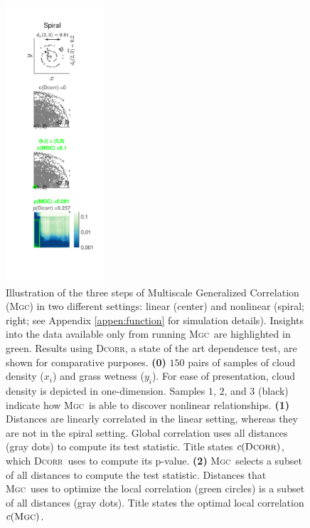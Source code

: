 \documentclass[11pt]{article}
\providecommand{\sct}[1]{{\normalfont\textsc{#1}}}
\newcommand{\GG}{c}
\newcommand{\Mgc}{\sct{Mgc}}
\newcommand{\Dcorr}{\sct{Dcorr}}
\begin{document}
\begin{figure}
\includegraphics[width=0.32\textwidth,height=0.75\textheight,trim={1.95cm 1.88cm 0.73cm 1.57cm},clip]{Figures/Fig8.pdf}
\caption{Illustration of the three steps of Multiscale Generalized Correlation (\Mgc) in two different settings: linear (center) and nonlinear (spiral; right; see Appendix \ref{appen:function} for simulation details). Insights into the data available only from running \Mgc~are highlighted in green.  Results using \Dcorr, a state of the art dependence test, are shown for comparative purposes. 
\textbf{(0)}  $150$ pairs of samples of cloud density ($x_i$) and grass wetness ($y_i$). For ease of presentation, cloud density is depicted in one-dimension.
Samples $1$, $2$, and $3$ (black) indicate how \Mgc~is able to discover nonlinear relationships. 
% 
\textbf{(1)} Distances are linearly correlated in the linear setting, whereas they are not in the spiral setting.  Global correlation uses all distances (gray dots) to compute its test statistic. Title states $\GG(\Dcorr)$, which \Dcorr~uses to compute its p-value.
% 
\textbf{(2)} \Mgc~selects a subset of all distances to compute the test statistic. Distances that \Mgc~uses to optimize the local correlation (green circles) is a subset of all distances (gray dots). Title states the optimal local correlation $\GG(\Mgc)$.
}
\end{figure}
\end{document}
